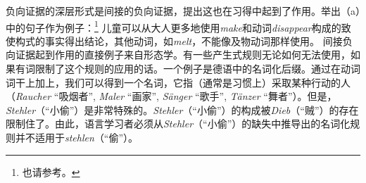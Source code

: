 负向证据的深层形式是间接的负向证据，\citet[]{Chomsky81a}提出这也在习得中起到了作用。\citet[Section~5.2]{Goldberg95a}举出（a）中的句子作为例子：\footnote{
也请参考。
}
\eal
{}
\zl
儿童可以从大人更多地使用\emph{make}和动词\emph{disappear}构成的致使构式的事实得出结论，其他动词，如\emph{melt}，不能像及物动词那样使用。
间接负向证据起到作用的直接例子来自形态学。有一些产生式规则无论如何无法使用，如果有词限制了这个规则的应用的话。一个例子是德语中的名词化后缀。通过在动词词干上加上，我们可以得到一个名词，它指（通常是习惯上）采取某种行动的人（\emph{Raucher} “吸烟者”, \emph{Maler} “画家”, \emph{Sänger} “歌手”, \emph{Tänzer} “舞者”）。但是，\emph{Stehler}（“小偷”）是非常特殊的。\emph{Stehler}（“小偷”）的构成被\emph{Dieb}（“贼”）的存在限制住了。由此，语言学习者必须从\emph{Stehler}（“小偷”）的缺失中推导出的名词化规则并不适用于\emph{stehlen}（“偷”）。

